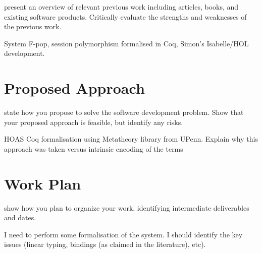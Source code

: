 \documentclass{mprop}
\begin{document}
present an overview of relevant previous work including articles, books, and
existing software products. Critically evaluate the strengths and weaknesses
of the previous work.

System F-pop, session polymorphism formalised in Coq, Simon's Isabelle/HOL
development.

\section{Proposed Approach}

state how you propose to solve the software development problem. Show that
your proposed approach is feasible, but identify any risks.

HOAS Coq formalisation using Metatheory library from UPenn.
Explain why this approach was taken versus intrinsic encoding of the terms

\section{Work Plan}

show how you plan to organize your work, identifying intermediate deliverables
and dates.

I need to perform some formalisation of the system. I should identify the key
issues (linear typing, bindings (as claimed in the literature), etc).


\printbibliography
\end{document}
